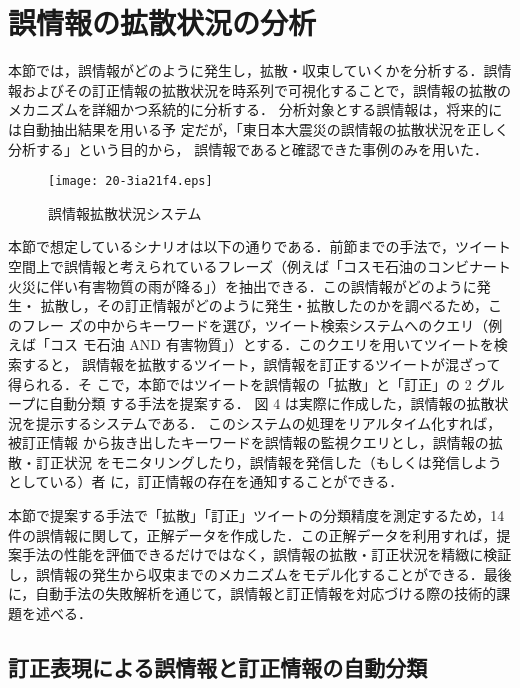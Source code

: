 \documentclass[japanese]{jnlp_1.4}
\begin{document}
\section{誤情報の拡散状況の分析}

本節では，誤情報がどのように発生し，拡散・収束していくかを分析する．誤情
報およびその訂正情報の拡散状況を時系列で可視化することで，誤情報の拡散の
メカニズムを詳細かつ系統的に分析する．
分析対象とする誤情報は，将来的には自動抽出結果を用いる予
定だが，「東日本大震災の誤情報の拡散状況を正しく分析する」という目的から，
誤情報であると確認できた事例のみを用いた．

\begin{figure}[b]
\begin{center}
  \texttt{[image: 20-3ia21f4.eps]}
\end{center}
\caption{誤情報拡散状況システム}
\label{fig:system}
\end{figure}

本節で想定しているシナリオは以下の通りである．前節までの手法で，ツイート
空間上で誤情報と考えられているフレーズ（例えば「コスモ石油のコンビナート
火災に伴い有害物質の雨が降る」）を抽出できる．この誤情報がどのように発生・
拡散し，その訂正情報がどのように発生・拡散したのかを調べるため，このフレー
ズの中からキーワードを選び，ツイート検索システムへのクエリ（例えば「コス
モ石油 AND 有害物質」）とする．このクエリを用いてツイートを検索すると，
誤情報を拡散するツイート，誤情報を訂正するツイートが混ざって得られる．そ
こで，本節ではツイートを誤情報の「拡散」と「訂正」の 2 グループに自動分類
する手法を提案する．
図 4 は実際に作成した，誤情報の拡散状況を提示するシステムである．
このシステムの処理をリアルタイム化すれば，被訂正情報
から抜き出したキーワードを誤情報の監視クエリとし，誤情報の拡散・訂正状況
をモニタリングしたり，誤情報を発信した（もしくは発信しようとしている）者
に，訂正情報の存在を通知することができる．

本節で提案する手法で「拡散」「訂正」ツイートの分類精度を測定するため，14
件の誤情報に関して，正解データを作成した．この正解データを利用すれば，提
案手法の性能を評価できるだけではなく，誤情報の拡散・訂正状況を精緻に検証
し，誤情報の発生から収束までのメカニズムをモデル化することができる．最後
に，自動手法の失敗解析を通じて，誤情報と訂正情報を対応づける際の技術的課
題を述べる．


\subsection{訂正表現による誤情報と訂正情報の自動分類}
\end{document}
